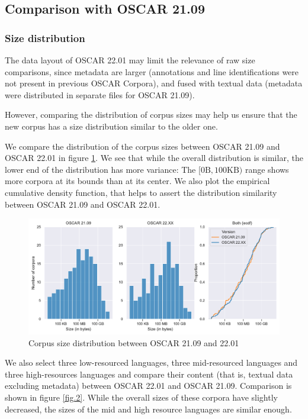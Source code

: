 \subsection{Comparison with OSCAR 21.09}
\subsubsection{Size distribution}

The data layout of OSCAR 22.01 may limit the relevance of raw size comparisons, since metadata are larger (annotations and line identifications were not present in previous OSCAR Corpora), and fused with textual data (metadata were distributed in separate files for OSCAR 21.09).

However, comparing the distribution of corpus sizes may help us ensure that the new corpus has a size distribution similar to the older one.

We compare the distribution of the corpus sizes between OSCAR 21.09 and OSCAR 22.01 in figure \ref{fig.1}. We see that while the overall distribution is similar, the lower end of the distribution has more variance: The $[0\text{B}, 100\text{KB})$ range shows more corpora at its bounds than at its center. We also plot the empirical cumulative density function, that helps to assert the distribution similarity between OSCAR 21.09 and OSCAR 22.01.

\begin{figure}[!ht]
    \begin{center}
        \includegraphics[scale=0.7]{static/media/oscar/towards/size-comp}
        \caption{Corpus size distribution between OSCAR 21.09 and 22.01}
        \label{fig.1}
    \end{center}
\end{figure}

We also select three low-resourced languages, three mid-resourced languages and three high-resources languages and compare their content (that is, textual data excluding metadata) between OSCAR 22.01 and OSCAR 21.09. Comparison is shown in figure \ref{fig.2}. While the overall sizes of these corpora  have slightly decreased, the sizes of the mid and high resource languages are similar enough.

